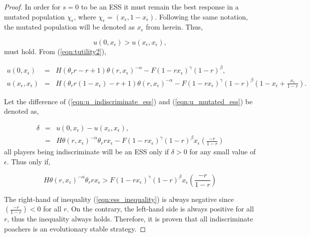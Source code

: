 \documentclass[10pt]{article}
\begin{document}
\begin{proof}
    In order for \(s=0\) to be an ESS it must
    remain the best response in a mutated population \(\chi_\epsilon\),
    where \(\chi_{\epsilon}=(x_\epsilon, 1 - x_\epsilon)\). Following the same
    notation, the mutated population will be denoted as \(x_\epsilon\) from
    herein. Thus,

    \begin{equation}\label{eqn:evolutionary_stability}
        u(0, x_\epsilon) > u(x_\epsilon, x_\epsilon),
    \end{equation}
    must hold. From (\ref{eqn:tutility2}),

    \begin{eqnarray}
        \label{eqn:u_indiscriminate_ess}
        u(0, x_\epsilon)  &=& H(\theta_rr - r + 1)\theta(r, x_\epsilon) ^{-\alpha}
        - F(1 - rx_\epsilon) ^ {\gamma} (1- r) ^ {\beta}, 
        \\
        \label{eqn:u_mutated_ess}
         u(x_\epsilon, x_\epsilon) &=& H(\theta_rr(1 - x_\epsilon)-r+ 1)\theta(r,
        x_\epsilon) ^{-\alpha} - F(1 - rx_\epsilon) ^ {\gamma} (1- r) ^
        {\beta}\left(1 - 
        x_\epsilon + \frac{x_\epsilon}{1- r}\right).
\end{eqnarray}

    Let the difference of (\ref{eqn:u_indiscriminate_ess}) and (\ref{eqn:u_mutated_ess})
    be denoted as,

    \begin{eqnarray}
        \label{eqn:delta}
        \delta &=& u(0, x_\epsilon) - u(x_\epsilon, x_\epsilon),
          \\
         &=& H\theta(r,  x_\epsilon) ^{-\alpha} \theta_r r x_\epsilon -
        F(1 - r x_\epsilon) ^ {\gamma} (1- r) ^
        {\beta}x_\epsilon\left(\frac{-r}{1- r}\right)
    \end{eqnarray}
    all players being indiscriminate will be an ESS only if \(\delta >0 \) for any small
    value of \(\epsilon\). Thus only if,

    \begin{equation}
    \label{eqn:ess_inequality}
        H\theta(r, x_\epsilon) ^{-\alpha} \theta_r r x_\epsilon > F
        (1 - r x_\epsilon) ^ {\gamma} (1- r) ^ {\beta}
        x_\epsilon\left(\frac{-r}{1- r}\right)
    \end{equation}

    The right-hand of inequality (\ref{eqn:ess_inequality}) is always negative
    since \((\frac{-r}{1- r}) < 0\)  for all \(r\). On the contrary, the left-hand
    side is always positive for all \(r\), thus the inequality always holds.
    Therefore, it is proven that all indiscriminate poachers is an evolutionary
    stable strategy.
\end{proof}
\end{document}
